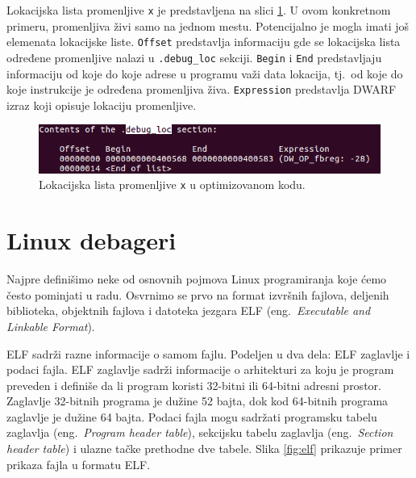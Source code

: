 \documentclass[12pt,oneside]{memoir}
\begin{document}
Lokacijska lista promenljive \texttt{x} je predstavljena na slici \ref{fig:debugLoc}. U ovom konkretnom primeru, promenljiva živi samo na jednom mestu. Potencijalno je mogla imati još elemenata lokacijske liste. \texttt{Offset} predstavlja informaciju gde se lokacijska lista određene promenljive nalazi u \texttt{.debug\_loc} sekciji. \texttt{Begin} i \texttt{End} predstavljaju informaciju od koje do koje adrese u programu važi data lokacija, tj.~od koje do koje instrukcije je određena promenljiva živa. \texttt{Expression} predstavlja DWARF izraz koji opisuje lokaciju promenljive.

\begin{figure}[h!]
	\begin{center}
		\includegraphics[scale=0.6]{slike/debugLoc.png}
	\end{center}
	\caption{Lokacijska lista promenljive \texttt{x} u optimizovanom kodu.}
	\label{fig:debugLoc}
\end{figure}

\section{Linux debageri}

Najpre definišimo neke od osnovnih pojmova Linux programiranja koje ćemo često pominjati u radu.
Osvrnimo se prvo na format izvršnih fajlova, deljenih biblioteka, objektnih fajlova i datoteka jezgara ELF (eng.~\emph{Executable and Linkable Format})\cite{ELF}.

ELF sadrži razne informacije o samom fajlu. Podeljen u dva dela: ELF zaglavlje i podaci fajla. ELF zaglavlje sadrži informacije o arhitekturi za koju je program preveden i definiše da li program koristi 32-bitni ili 64-bitni adresni prostor. Zaglavlje 32-bitnih programa je dužine 52 bajta, dok kod 64-bitnih programa zaglavlje je dužine 64 bajta. Podaci fajla mogu sadržati programsku tabelu zaglavlja (eng.~\emph{Program header table}), sekcijsku tabelu zaglavlja (eng.~\emph{Section header table}) i ulazne tačke prethodne dve tabele. Slika \ref{fig:elf} prikazuje primer prikaza fajla u formatu ELF.
\end{document}
